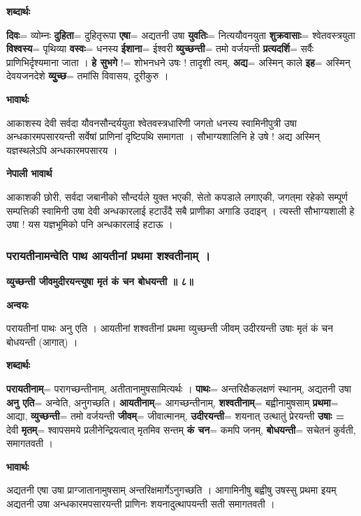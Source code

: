 \documentclass[11pt, a5paper]{article}
\begin{document}
\textbf{शब्दार्थः}

\textbf{दिवः}= व्योम्नः \textbf{दुहिता}= दुहितृरूपा \textbf{एषा}= अद्यतनी उषा \textbf{युवतिः}= नित्ययौवनयुता \textbf{शुक्रवासाः}= श्वेतवस्त्रयुता \textbf{विश्वस्य}= पृथिव्या \textbf{वस्वः}= धनस्य \textbf{ईशाना}= ईश्वरी \textbf{व्युच्छन्ती}= तमो वर्जयन्ती \textbf{प्रत्यदर्शि}= सर्वैः प्राणिभिर्दृश्यमाना जाता । \textbf{हे सुभगे} != शोभनधने उषः ! तादृशी त्वम्, \textbf{अद्य}= अस्मिन् काले \textbf{इह}= अस्मिन् देवयजनदेशे \textbf{व्युुच्छ}= तमांसि विवासय, दूरीकुरु ।

\textbf{भावार्थः}

आकाशस्य देवी सर्वदा यौवनसौन्दर्ययुता श्वेतवस्त्रधारिणी जगतो धनस्य स्वामिनीपुत्री उषा अन्धकारमपसारयन्ती सर्वेषां प्राणिनां दृष्टिपथि समागता । सौभाग्यशालिनि हे उषे !  अद्य अस्मिन् यज्ञस्थलेऽपि अन्धकारमपसारय ।

\textbf{नेपाली भावार्थ}

आकाशकी छोरी, सर्वदा जबानीको सौन्दर्यले युक्त भएकी, सेतो कपडाले लगाएकी, जगत्‌मा रहेको सम्पूर्ण सम्पत्तिकी स्वामिनी उषा देवी अन्धकारलाई हटाउँदै सबै प्राणीका अगाडि उदाइन् । त्यस्ती सौभाग्यशाली हे उषा ! यस यज्ञभूमिको पनि अन्धकारलाई हटाऊ ।

\subsubsection{\textbf{परायतीनामन्वेति पाथ आयतीनां प्रथमा शश्वतीनाम् ।}}

\textbf{व्युच्छन्ती जीवमुदीरयन्त्युषा मृतं कं चन बोधयन्ती ॥ ८॥}

\textbf{अन्वयः}

परायतीनां पाथः अनु एति । आयतीनां शश्वतीनां प्रथमा व्युच्छन्ती जीवम् उदीरयन्ती उषाः मृतं कं चन बोधयन्ती (आगात्) ।

\textbf{शब्दार्थः}

\textbf{परायतीनाम्}= परागच्छन्तीनाम्, अतीतानामुषसामित्यर्थः । \textbf{पाथः}= अन्तरिक्षैकलक्षणं स्थानम्,  अद्यतनी उषा \textbf{अनु एति}= अन्वेति, अनुगच्छति। \textbf{आयतीनाम्}= आगच्छन्तीनाम्, \textbf{शश्वतीनाम्}= बह्वीनामुषसाम् \textbf{प्रथमा}= आद्या, \textbf{व्युच्छन्ती}= तमो वर्जयन्ती \textbf{जीवम्}= जीवात्मानम्, \textbf{उदीरयन्ती}= शयनात् उत्थातुं प्रेरयन्ती \textbf{उषाः =} देवी \textbf{मृतम्}= श्वापसमये प्रलीनेन्द्रियत्वात् मृतमिव सन्तम् \textbf{कं चन}= कमपि जनम्, \textbf{बोधयन्ती}= सचेतनं कुर्वती, समागतवती ।

\textbf{भावार्थः}

अद्यतनी एषा उषा प्राग्जातानामुषसाम् अन्तरिक्षमार्गेऽनुगच्छति । आगामिनीषु बह्वीषु उषस्सु प्रथमा इयम् अद्यतनी उषा अन्धकारमपसारयन्ती प्राणिनः शयनादुत्थापयन्ती सती समागतवती ।
\end{document}
